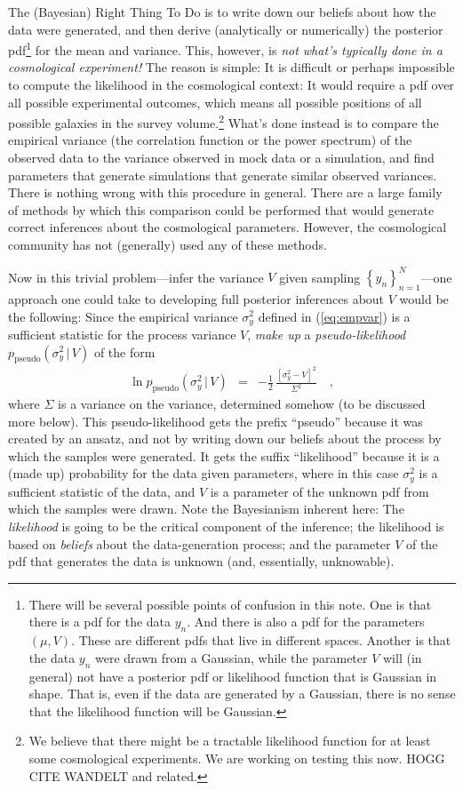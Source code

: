 \documentclass[12pt, letterpaper, preprint]{aastex}
\newcommand{\setof}[1]{\left\{{#1}\right\}}
\newcommand{\given}{\,|\,}
\newcommand{\pseudo}{{\mathrm{pseudo}}}
\newcommand{\documentname}{note}
\begin{document}
The (Bayesian) Right Thing To Do is to write down our beliefs about
how the data were generated, and then derive (analytically or
numerically) the posterior pdf\footnote{There will be several possible
  points of confusion in this \documentname. One is that there is a
  pdf for the data $y_n$. And there is also a pdf for the parameters
  $(\mu,V)$. These are different pdfs that live in different
  spaces. Another is that the data $y_n$ were drawn from a Gaussian,
  while the parameter $V$ will (in general) not have a
  posterior pdf  or likelihood function that is Gaussian in shape. That is, even if the data are
  generated by a Gaussian, there is no sense that the likelihood
  function will be Gaussian.} for the mean and
variance.
This, however, is \emph{not what's typically done in a cosmological
experiment!}
The reason is simple: It is difficult or perhaps impossible to compute
the likelihood in the cosmological context: It would require a pdf
over all possible experimental outcomes, which means all possible
positions of all possible galaxies in the survey volume.\footnote{We
  believe that there might be a tractable likelihood function for at
  least some cosmological experiments. We are working on testing this
  now. HOGG CITE WANDELT and related.}
What's done instead is to compare the empirical variance (the
correlation function or the power spectrum) of the observed data to
the variance observed in mock data or a simulation, and find
parameters that generate simulations that generate similar observed
variances.
There is nothing wrong with this procedure in general.  There are a
large family of methods by which this comparison could be performed
that would generate correct inferences about the cosmological
parameters.
However, the cosmological community has not (generally) used any of
these methods.

Now in this trivial problem---infer the variance $V$ given sampling
$\setof{y_n}_{n=1}^N$---one approach one could take to developing full
posterior inferences about $V$ would be the following:
Since the empirical variance $\sigma^2_y$ defined in (\ref{eq:empvar})
is a sufficient statistic for the process variance $V$, \emph{make up}
a \emph{pseudo-likelihood} $p_\pseudo(\sigma^2_y\given V)$ of the form
\begin{eqnarray}
\ln p_\pseudo(\sigma^2_y\given V) &=& -\frac{1}{2}\,\frac{[\sigma^2_y - V]^2}{\Sigma^2}
\label{eq:pseudo}\quad ,
\end{eqnarray}
where $\Sigma$ is a variance on the variance, determined somehow (to
be discussed more below).
This pseudo-likelihood gets the prefix ``pseudo'' because it was
created by an ansatz, and not by writing down our beliefs about the
process by which the samples were generated.
It gets the suffix ``likelihood'' because it is a (made up)
probability for the data given parameters, where in this case
$\sigma^2_y$ is a sufficient statistic of the data, and $V$ is a
parameter of the unknown pdf from which the samples were drawn.
Note the Bayesianism inherent here:
The \emph{likelihood} is going to be the critical component of the
inference; the likelihood is based on \emph{beliefs} about the
data-generation process; and the parameter $V$ of the pdf that
generates the data is unknown (and, essentially, unknowable).
\end{document}
